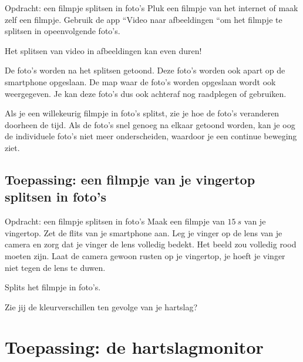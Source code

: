 \begin{opdracht}{Opdracht: een filmpje splitsen in foto's}
Pluk een filmpje van het internet of maak zelf een filmpje. Gebruik de app \textquotedblleft Video naar afbeeldingen \textquotedblleft om het filmpje te splitsen in opeenvolgende foto's. 

\begin{opmerking}
Het splitsen van video in afbeeldingen kan even duren!
\end{opmerking}

De foto's worden na het splitsen getoond. Deze foto's worden ook apart op de smartphone opgeslaan. De map waar de foto's worden opgeslaan wordt ook weergegeven. Je kan deze foto's dus ook achteraf nog raadplegen of gebruiken.

\end{opdracht}

Als je een willekeurig filmpje in foto's splitst, zie je hoe de foto's veranderen doorheen de tijd. Als de foto's snel genoeg na elkaar getoond worden, kan je oog de individuele foto's niet meer onderscheiden, waardoor je een continue beweging ziet.

\subsection{Toepassing: een filmpje van je vingertop splitsen in foto's}

\begin{opdracht}{Opdracht: een filmpje splitsen in foto's}
	Maak een filmpje van $15~s$ van je vingertop. Zet de flits van je smartphone aan. Leg je vinger op de lens van je camera en zorg dat je vinger de lens volledig bedekt. Het beeld zou volledig rood moeten zijn. Laat de camera gewoon rusten op je vingertop, je hoeft je vinger niet tegen de lens te duwen. 
	
	Splits het filmpje in foto's. 
	
	Zie jij de kleurverschillen ten gevolge van je hartslag?
\end{opdracht}


\section{Toepassing: de hartslagmonitor}
\label{sec:Mod3_Sec3}
%

